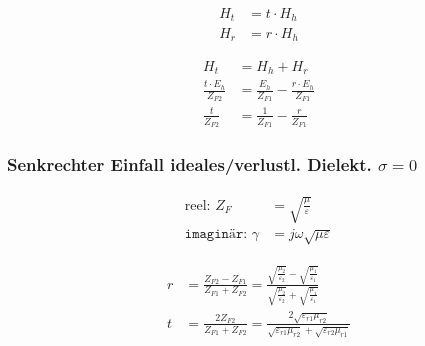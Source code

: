 \begin{align*}
    H_t & = t \cdot H_h \\
    H_r & = r \cdot H_h
\end{align*}

\begin{align*}
    H_t                         & = H_h + H_r                                          \\
    \frac{t\cdot E_{h}}{Z_{F2}} & = \frac{E_{h}}{Z_{F1}} - \frac{r\cdot E_{h}}{Z_{F1}} \\
    \frac{t}{Z_{F2}}            & = \frac{1}{Z_{F1}} - \frac{r}{Z_{F1}}
\end{align*}




\subsubsection[Senkrechter Einfall ideales/verlustl. Dielekt.]{Senkrechter Einfall ideales/verlustl. Dielekt. $\sigma = 0$}


\begin{align*}
    \text{reel: }Z_F          & = \sqrt{\frac{\mu}{\varepsilon}} \\
    \texttt{imaginär: }\gamma & = j \omega\sqrt{\mu\varepsilon}
\end{align*}

\begin{align*}
    r & = \frac{Z_{F2} - Z_{F1}}{Z_{F1} + Z_{F2}} = \frac{\sqrt{\frac{\mu_2}{\varepsilon_2}} - \sqrt{\frac{\mu_1}{\varepsilon_1}}}{\sqrt{\frac{\mu_2}{\varepsilon_2}} + \sqrt{\frac{\mu_1}{\varepsilon_1}}} \\
    t & = \frac{2 Z_{F2}}{Z_{F1} + Z_{F2}} = \frac{2\sqrt{\varepsilon_{r1}\mu_{r2}}}{\sqrt{\varepsilon_{r1}\mu_{r2}}+\sqrt{\varepsilon_{r2}\mu_{r1}}}
\end{align*}


